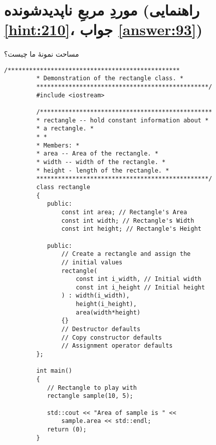 \section[موردِ مربعِ ناپدیدشونده]{موردِ مربعِ ناپدیدشونده \protect{} (راهنمایی \ref{hint:210}، جواب \ref{answer:93})}
\paragraph{}\label{prog:52}
مساحت نمونهٔ ما چیست؟

\begin{LTR}
    \begin{lstlisting}[style=C++Style]
         /************************************************
         * Demonstration of the rectangle class. *
         ************************************************/
         #include <iostream>

         /************************************************
         * rectangle -- hold constant information about *
         * a rectangle. *
         * *
         * Members: *
         * area -- Area of the rectangle. *
         * width -- width of the rectangle. *
         * height - length of the rectangle. *
         ************************************************/
         class rectangle
         {
         	public:
         		const int area; // Rectangle's Area
         		const int width; // Rectangle's Width
         		const int height; // Rectangle's Height

         	public:
         		// Create a rectangle and assign the
         		// initial values
         		rectangle(
         			const int i_width, // Initial width
         			const int i_height // Initial height
         		) : width(i_width),
         			height(i_height),
         			area(width*height)
         		{}
         		// Destructor defaults
         		// Copy constructor defaults
         		// Assignment operator defaults
         };

         int main()
         {
         	// Rectangle to play with
         	rectangle sample(10, 5);

         	std::cout << "Area of sample is " <<
         		sample.area << std::endl;
         	return (0);
         }
    \end{lstlisting}
\end{LTR}